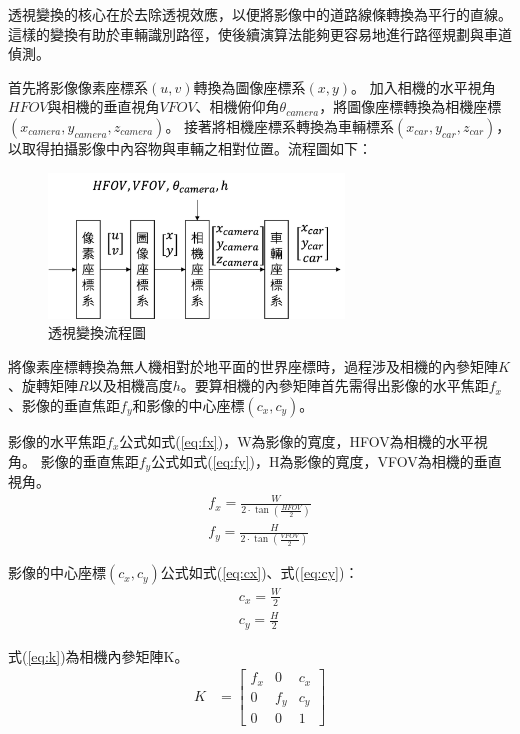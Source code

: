 \documentclass[12pt]{article}       %
\begin{document}
透視變換的核心在於去除透視效應，以便將影像中的道路線條轉換為平行的直線。這樣的變換有助於車輛識別路徑，使後續演算法能夠更容易地進行路徑規劃與車道偵測。

首先將影像像素座標系$(u,v)$轉換為圖像座標系$(x,y)$。
加入相機的水平視角$HFOV$與相機的垂直視角$VFOV$、相機俯仰角$\theta_{camera}$，將圖像座標轉換為相機座標$(x_{camera},y_{camera},z_{camera})$。
接著將相機座標系轉換為車輛標系$(x_{car},y_{car},z_{car})$，以取得拍攝影像中內容物與車輛之相對位置。流程圖如下：
\begin{figure}[H]
    \centering
    \includegraphics[width=0.7\textwidth]{12.jpg}     %
    \caption{透視變換流程圖}    %
    \label{fig:12}    %
\end{figure}
將像素座標轉換為無人機相對於地平面的世界座標時，過程涉及相機的內參矩陣$K$、旋轉矩陣$R$以及相機高度$h$。要算相機的內參矩陣首先需得出影像的水平焦距$f_{x}$、影像的垂直焦距$f_{y}$和影像的中心座標$(c_x,c_y)$。

影像的水平焦距$f_{x}$公式如式(\ref{eq:fx})，W為影像的寬度，HFOV為相機的水平視角。
影像的垂直焦距$f_{y}$公式如式(\ref{eq:fy})，H為影像的寬度，VFOV為相機的垂直視角。
\begin{align}
    f_{x}=\frac{W}{2\cdot\tan\left(\frac{HFOV}{2}\right)}
    \label{eq:fx}
    \\
    f_{y}=\frac{H}{2\cdot\tan\left(\frac{VFOV}{2}\right)}
    \label{eq:fy}
\end{align}

影像的中心座標$(c_x,c_y)$公式如式(\ref{eq:cx})、式(\ref{eq:cy})：
\begin{align}
    c_{x}=\frac{W}{2}
    \label{eq:cx}
    \\
    c_{y}=\frac{H}{2}
    \label{eq:cy}
\end{align}

式(\ref{eq:k})為相機內參矩陣K。
\begin{align}
    K &=
    \begin{bmatrix}
        f_{x}       & 0             & c_{x}     \\
        0           & f_{y}         & c_{y}     \\
        0           & 0             & 1
    \end{bmatrix} 
    \label{eq:k}
\end{align}
\end{document}
